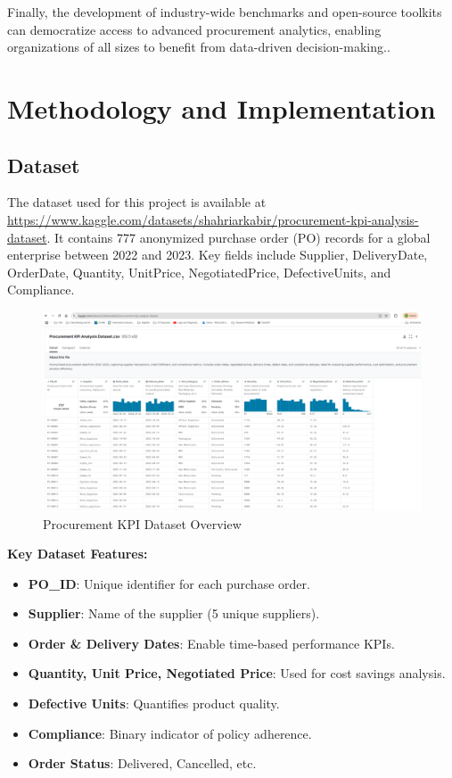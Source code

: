 \documentclass[10pt, twocolumn]{article}
\begin{document}
Finally, the development of industry-wide benchmarks and open-source toolkits can democratize access to advanced procurement analytics, enabling organizations of all sizes to benefit from data-driven decision-making..


\section{Methodology and Implementation}

\subsection{Dataset}
The dataset used for this project is available at \url{https://www.kaggle.com/datasets/shahriarkabir/procurement-kpi-analysis-dataset}.
It contains 777 anonymized purchase order (PO) records for a global enterprise between 2022 and 2023. 
Key fields include Supplier, DeliveryDate, OrderDate, Quantity, UnitPrice, NegotiatedPrice, DefectiveUnits, and Compliance.

\begin{figure}[H]
    \centering
    \includegraphics[width=1\linewidth]{Images/dataset_overview.png}
    \caption{Procurement KPI Dataset Overview}
    \label{fig:enter-label}
\end{figure}

\textbf{Key Dataset Features:}
\begin{itemize}
    \item \textbf{PO\_ID}: Unique identifier for each purchase order.
    \item \textbf{Supplier}: Name of the supplier (5 unique suppliers).
    \item \textbf{Order \& Delivery Dates}: Enable time-based performance KPIs.
    \item \textbf{Quantity, Unit Price, Negotiated Price}: Used for cost savings analysis.
    \item \textbf{Defective Units}: Quantifies product quality.
    \item \textbf{Compliance}: Binary indicator of policy adherence.
    \item \textbf{Order Status}: Delivered, Cancelled, etc.
\end{itemize}
\end{document}
